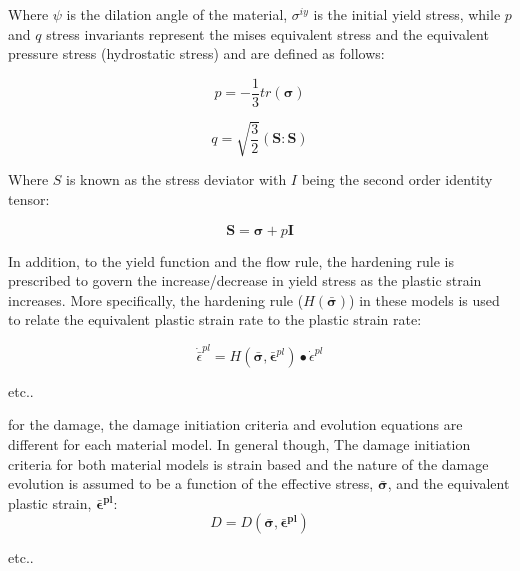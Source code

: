 Where $\psi$ is the dilation angle of the material, $\sigma^{iy}$ is the initial yield stress, while $p$ and $q$ stress invariants represent the mises
equivalent stress and the equivalent pressure stress (hydrostatic stress) and are defined as follows:

\begin{equation}
p=-\frac{1}{3}tr\left(\boldsymbol{\sigma}\right)\label{eqn:druc3}
\end{equation}

\begin{equation}
q=\sqrt{\frac{3}{2}}\left(\mathbf{S}:\mathbf{S}\right)\label{eqn:druc4}
\end{equation}

Where $S$ is known as the stress deviator with $I$ being the second order identity tensor:

\begin{equation}
\mathbf{S}=\boldsymbol{\sigma}+p\mathbf{I}\label{eqn:druc4-1}
\end{equation}

In addition, to the yield function and the flow rule, the hardening rule is prescribed to govern the increase/decrease in yield stress as the plastic strain increases. More specifically, the hardening rule ($H\left(\bar{\boldsymbol{\sigma}}\right)$) in these models is used to relate the equivalent plastic strain rate to the plastic strain rate: 

\begin{equation}
    \dot{\bar{\epsilon}}^{pl} 
    = 
    H
    \left(
        \bar{\boldsymbol{\sigma}}, \bar{\boldsymbol{\epsilon}}^{pl}
    \right)
    \bullet \dot{\epsilon}^{pl}
   
\label{eqn:const8d}
\end{equation}

etc..

for the damage, the damage initiation criteria and evolution equations are different for each material model. In general though, The damage initiation criteria for both material models is strain based and the nature of the damage evolution is assumed to be a function of the effective stress, $\boldsymbol{\bar{\sigma}}$, and the equivalent plastic strain, $\boldsymbol{\bar{\epsilon}^{pl}}$:
\begin{equation}
D=D(\boldsymbol{\bar{\sigma}},\boldsymbol{\bar{\epsilon}^{pl}})\label{eqn:const8}
\end{equation}



etc..





